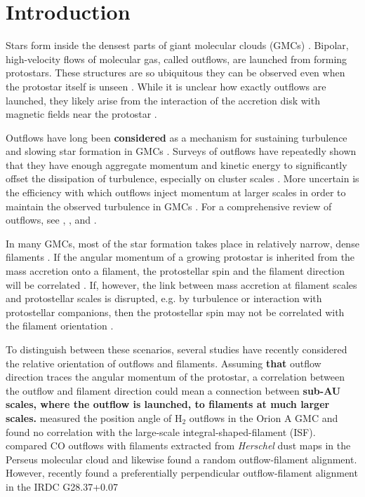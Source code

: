 \documentclass[twocolumn]{aastex63}
\begin{document}
\section{Introduction}
Stars form inside the densest parts of giant molecular clouds (GMCs) \citep{McKee07}. Bipolar, high-velocity flows of molecular gas, called outflows, are launched from forming protostars. These structures are so ubiquitous they can be observed even when the protostar itself is unseen \citep{Kong19}. While it is unclear how exactly outflows are launched, they likely arise from the interaction of the accretion disk with magnetic fields near the protostar \citep[e.g.][]{Konigl00,Shu00,Frank14}.

Outflows have long been \textbf{considered} as a mechanism for sustaining turbulence and slowing star formation in GMCs \citep{Nakamura07,Carroll09,Federrath15}. Surveys of outflows have repeatedly shown that they have enough aggregate momentum and kinetic energy to significantly offset the dissipation of turbulence, especially on cluster scales \citep{Arce10,Nakamura11,Plunkett13,Plunkett15,Li15}. More uncertain is the efficiency with which outflows inject momentum at larger scales in order to maintain the observed turbulence in GMCs \citep{Brunt09,Padoan09,Carroll10}. For a comprehensive review of outflows, see \citet{Arce07}, \citet{Frank14}, and \citet{Bally16}.

In many GMCs, most of the star formation takes place in relatively narrow, dense filaments \citep{Arzoumanian11,Suri19}. If the angular momentum of a growing protostar is inherited from the mass accretion onto a filament, the protostellar spin and the filament direction will be correlated \citep{Bodenheimer95,Andre14,Li19}. If, however, the link between mass accretion at filament scales and protostellar scales is disrupted, e.g. by turbulence or interaction with protostellar companions, then the protostellar spin may not be correlated with the filament orientation \citep{Offner16,Lee17}.


To distinguish between these scenarios, several studies have recently considered the relative orientation of outflows and filaments. Assuming \textbf{that} outflow direction traces the angular momentum of the protostar, a correlation between the outflow and filament direction could mean a connection between \textbf{sub-AU scales, where the outflow is launched, to filaments at much larger scales.} \citet{Davis09} measured the position angle of H$_2$ outflows in the Orion A GMC and found no correlation with the large-scale integral-shaped-filament (ISF). \citet{Stephens17} compared CO outflows with filaments extracted from \emph{Herschel} dust maps in the Perseus molecular cloud and likewise found a random outflow-filament alignment. However, \citet{Kong19} recently found a preferentially perpendicular outflow-filament alignment in the IRDC G28.37+0.07
\end{document}
